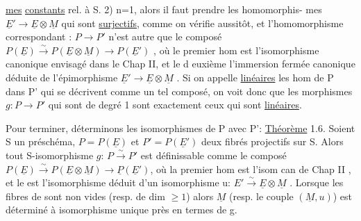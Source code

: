 
\uline{mes} \uline{constants} rel. à S. 2) n=1, alors il faut prendre les homomorphis-%
mes  $\underline{E}'\to \underline{E}\otimes\underline{M}$ qui sont \uline{surjectifs}, comme on vérifie
aussitôt, et l'homomorphisme correspondant : $P\to P'$ n'est autre que le
composé $P(\underline{E})\xrightarrow{\sim}P(\underline{E}\otimes\underline{M})\to P(\underline{E}')$ , où le premier hom est l'isomorphisme
canonique envisagé dans le Chap II, et le d euxième l'immersion fermée
canonique déduite de l'épimorphisme $\underline{E}'\to\underline{E}\otimes\underline{M}$ . Si on appelle \uline{linéaires}
les hom de P dans P' qui se décrivent comme un tel composé, on voit donc
que les morphismes $g:P\to P'$ qui sont de degré 1 sont exactement ceux qui
sont \uline{linéaires}.

Pour terminer, déterminons les isomorphismes de P avec P':
\uline{Théorème} 1.6. Soient S un préschéma, $P=P(\underline{E})$ et $P'=P(\underline{E}')$ deux fibrés
projectifs sur S. Alors tout S-isomorphisme $g$: $P\xrightarrow{\sim}P'$ est définissable
comme le composé $P(\underline{E})\xrightarrow{\sim}P(\underline{E}\otimes\underline{M})\to \underline{P}(\underline{E}')$, où la premier hom est l'isom
can de Chap II , et le  est l'isomorphisme  déduit
d'un isomorphisme u: $E'\xrightarrow{\sim}\underline{E}\otimes\underline{M}$ . Lorsque les fibres de  sont non
vides (resp. de dim $\geq 1$) alors $\underline{M}$ (resp. le couple $(\underline{M},u)$) est déterminé
à isomorphisme unique près en termes de g.

